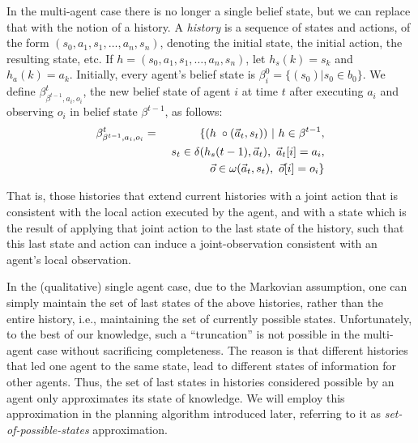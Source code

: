 \documentclass[letterpaper]{article}
\theoremstyle{definition}
\begin{document}
In the multi-agent case there is no longer a single belief state, but we can replace that with the notion of a history. A \emph{history} is a sequence of
states and actions, of the form $(s_0,a_1,s_1,\ldots,a_n,s_n)$, denoting the initial state, the initial action, the resulting state, etc.
If $h=(s_0,a_1,s_1,\ldots,a_n,s_n)$, let $h_s(k)= s_k$ and $h_a(k)=a_k$.
Initially, every agent's belief state is $\beta_i^0 = \{(s_0) | s_0 \in b_0\}.$
We define $\beta^t_{\beta^{t-1},a_i,o_i}$, the new belief state of agent $i$ at time $t$ after executing $a_i$ and observing $o_i$ in belief state $\beta^{t-1}$, as follows: \\[-12pt]

 \begin{eqnarray}
 \scriptsize
  \beta^t_{\beta^{t-1},a_i,o_i} & = & \{ (h\; \circ (\vec{a}_t,s_{t})) ~|~ h\in\beta^{t-1}, \\  \nonumber
&&~s_{t}\in\delta(h_s(t-1), \vec{a}_t),~\vec{a}_t[i] = a_i,\\  \nonumber
&& ~\vec{o} \in \omega(\vec{a}_t,s_{t}), ~\vec{o}[i] = o_i\}
\end{eqnarray}



That is, those histories that extend current histories with a joint action that is consistent with the local action executed by the agent, and
with a state which is the result of applying that joint action to the last state of the history, such that this last state and action can induce a
joint-observation consistent with an agent's local observation.

In the (qualitative) single agent case, due to the Markovian assumption, one can simply maintain the set of last states of the above histories, rather than the entire history, i.e., maintaining the set of currently possible states. Unfortunately, to the best of our knowledge, such a ``truncation'' is not possible in the multi-agent case without sacrificing completeness.
The reason is that different histories that led one agent to the same state, lead to different states of information for other agents. Thus, the set of last states in histories considered possible by an agent only approximates its state of knowledge.  We will employ this approximation in the planning algorithm introduced later, referring to it as {\em set-of-possible-states\/} approximation.
\end{document}
